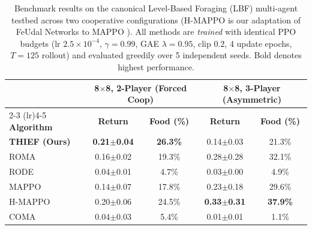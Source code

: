 \begin{table}[htbp]
\centering
\caption{Benchmark results on the canonical Level-Based Foraging (LBF) multi-agent testbed \citep{papoudakis2021benchmarking} across two cooperative configurations (H-MAPPO is our adaptation of FeUdal Networks \citep{vezhnevets2017feudal} to MAPPO \citep{yu2022surprising}). All methods are \emph{trained} with identical PPO budgets (lr $2.5{\times}10^{-4}$, $\gamma{=}0.99$, GAE $\lambda{=}0.95$, clip $0.2$, 4 update epochs, $T{=}125$ rollout) and evaluated greedily over 5 independent seeds. Bold denotes highest performance.}
\label{tab:lbf_benchmark}
\vspace{0.04in}
\footnotesize
\setlength{\tabcolsep}{4.0pt}
\renewcommand{\arraystretch}{1.08}
\begin{tabular}{l cc cc}
\toprule
 & \multicolumn{2}{c}{\textbf{8$\times$8, 2-Player (Forced Coop)}} & \multicolumn{2}{c}{\textbf{8$\times$8, 3-Player (Asymmetric)}} \\
\cmidrule(lr){2-3} \cmidrule(lr){4-5}
\textbf{Algorithm} & \textbf{Return} & \textbf{Food (\%)} & \textbf{Return} & \textbf{Food (\%)} \\
\midrule
\textbf{THIEF (Ours)} & \textbf{0.21\scriptsize$\pm$0.04} & \textbf{26.3\%} & 0.14\scriptsize$\pm$0.03 & 21.3\% \\
ROMA \citep{wang2020roma} & 0.16\scriptsize$\pm$0.02 & 19.3\% & 0.28\scriptsize$\pm$0.28 & 32.1\% \\
RODE \citep{wang2021rode} & 0.04\scriptsize$\pm$0.01 & 4.7\% & 0.03\scriptsize$\pm$0.00 & 4.9\% \\
MAPPO \citep{yu2022surprising} & 0.14\scriptsize$\pm$0.07 & 17.8\% & 0.23\scriptsize$\pm$0.18 & 29.6\% \\
H-MAPPO \citep{vezhnevets2017feudal,yu2022surprising} & 0.20\scriptsize$\pm$0.06 & 24.5\% & \textbf{0.33\scriptsize$\pm$0.31} & \textbf{37.9\%} \\
COMA \citep{foerster2018counterfactual} & 0.04\scriptsize$\pm$0.03 & 5.4\% & 0.01\scriptsize$\pm$0.01 & 1.1\% \\
\bottomrule
\end{tabular}
\end{table}
